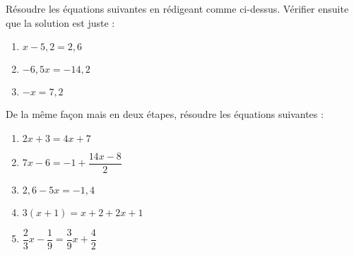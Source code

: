 \documentclass[a4paper,12pt]{article}
\begin{document}
\begin{activite}
\begin{tasks}
\begin{minipage}[c]{0.25\linewidth}
\end{minipage}


\task Résoudre les équations suivantes en rédigeant comme ci-dessus. Vérifier ensuite que la solution est juste :

\begin{multicols}{3}
\begin{enumerate}
\item $x - 5,2 = 2,6$
\item $-6,5x = -14,2$
\item $-x = 7,2$
\end{enumerate}
\end{multicols}

\task De la même façon mais en deux étapes, résoudre les équations suivantes :

\begin{multicols}{2}
\begin{enumerate}
\item $2x + 3 = 4x + 7$

\item $7x - 6 = -1 + \dfrac{14x - 8}{2}$

\item $2,6 - 5x = -1,4$

\item $3(x+1) = x+2+2x+1$

\item $\dfrac{2}{3}x - \dfrac{1}{9} = \dfrac{3}{9}x + \dfrac{4}{2}$
\end{enumerate}
\end{multicols}
\end{tasks}
\end{activite}
\end{document}
